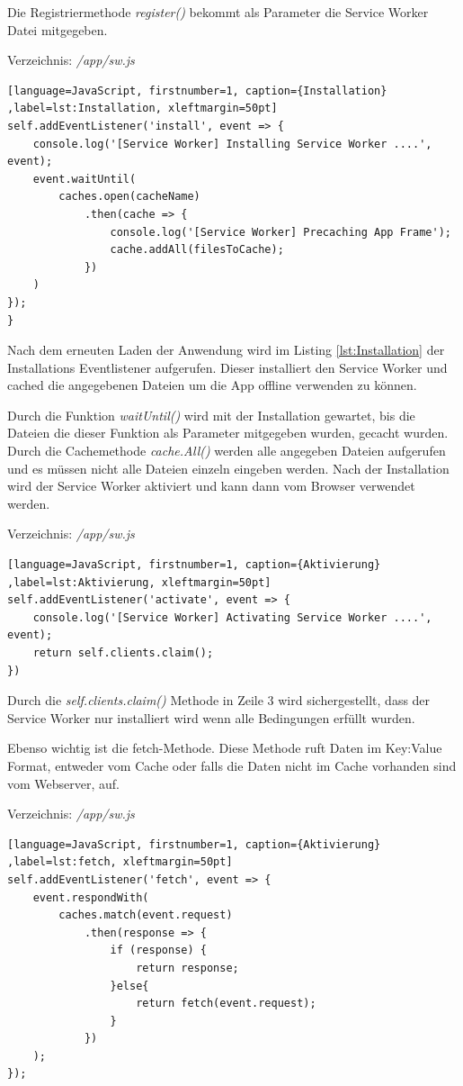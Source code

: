 \clearpage
Die Registriermethode \textit{register()} bekommt als Parameter die Service Worker Datei mitgegeben.

Verzeichnis: \textit{/app/sw.js}

\begin{lstlisting}[language=JavaScript, firstnumber=1, caption={Installation} ,label=lst:Installation, xleftmargin=50pt]
self.addEventListener('install', event => {
    console.log('[Service Worker] Installing Service Worker ....', event);
    event.waitUntil(
        caches.open(cacheName)
            .then(cache => {
                console.log('[Service Worker] Precaching App Frame');
                cache.addAll(filesToCache);
            })
    )
});
}
\end{lstlisting}

Nach dem erneuten Laden der Anwendung wird im Listing \ref{lst:Installation} der Installations Eventlistener aufgerufen. Dieser installiert den Service Worker und cached die angegebenen Dateien um die App offline verwenden zu können. 

Durch die Funktion \textit{waitUntil()} wird mit der Installation gewartet, bis die Dateien die dieser Funktion als Parameter mitgegeben wurden, gecacht wurden. Durch die Cachemethode \textit{cache.All()} werden alle angegeben Dateien aufgerufen und es müssen nicht alle Dateien einzeln eingeben werden.
Nach der Installation wird der Service Worker aktiviert und kann dann vom Browser verwendet werden.

Verzeichnis: \textit{/app/sw.js}

\begin{lstlisting}[language=JavaScript, firstnumber=1, caption={Aktivierung} ,label=lst:Aktivierung, xleftmargin=50pt]
self.addEventListener('activate', event => {
    console.log('[Service Worker] Activating Service Worker ....', event);
    return self.clients.claim();
})
\end{lstlisting}

Durch die \textit{self.clients.claim()} Methode in Zeile 3 wird sichergestellt, dass der Service Worker nur installiert wird wenn alle Bedingungen erfüllt wurden.

Ebenso wichtig ist die fetch-Methode. Diese Methode ruft Daten im Key:Value Format, entweder vom Cache oder falls die Daten nicht im Cache vorhanden sind vom Webserver, auf.

Verzeichnis: \textit{/app/sw.js}

\begin{lstlisting}[language=JavaScript, firstnumber=1, caption={Aktivierung} ,label=lst:fetch, xleftmargin=50pt]
self.addEventListener('fetch', event => {
    event.respondWith(
        caches.match(event.request)
            .then(response => {
                if (response) {
                    return response;
                }else{
                    return fetch(event.request);
                }
            })
    );
});
\end{lstlisting}

